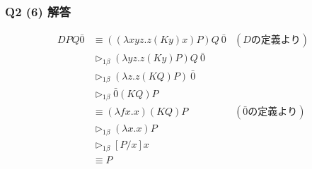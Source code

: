 \begin{frame}
    \frametitle{Q2 (6) 解答}
    \begin{align}
        DPQ\bar{0} &\equiv ((\lambda xyz.z(Ky)x)P)Q\ \bar{0} & (Dの定義より)\\
        &\triangleright_{1\beta} (\lambda yz.z(Ky)P)Q\ \bar{0} \\
        &\triangleright_{1\beta} (\lambda z.z(KQ)P)\ \bar{0} \\
        &\triangleright_{1\beta} \bar{0}(KQ)P \\
        &\equiv (\lambda fx.x)(KQ)P & (\bar{0}の定義より)\\
        &\triangleright_{1\beta} (\lambda x.x)P \\
        &\triangleright_{1\beta} [P/x]x \\
        &\equiv P
    \end{align}
\end{frame}